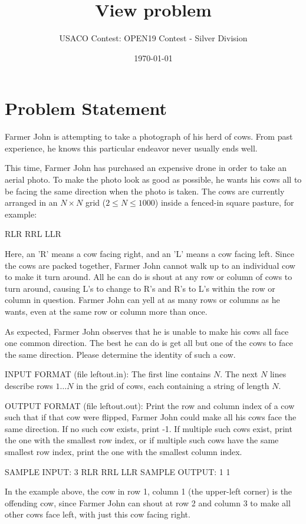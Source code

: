 \documentclass[12pt]{article}
\title{View problem}
\author{USACO Contest: OPEN19 Contest - Silver Division}
\date{\today}
\begin{document}
\maketitle

\section*{Problem Statement}

Farmer John is attempting to take a photograph of his herd of cows.  From past
experience, he knows this particular endeavor never usually ends well.  

This time, Farmer John has purchased an expensive drone in order to take an
aerial photo. To make the photo look as good as possible, he wants his cows all
to be facing the same direction when the photo is taken.  The cows are currently arranged
in an  $N \times N$ grid ($2 \leq N \leq 1000$) inside a fenced-in square
pasture,  for example:


RLR
RRL
LLR

Here, an 'R' means a cow facing right, and an 'L' means a cow facing left. Since
the cows are packed together, Farmer John cannot walk up to an individual cow to
make it turn around.  All he can do is shout at any row or column of cows to
turn around, causing L's to change to R's and R's to L's within the row or
column in question.  Farmer John can yell at as many rows or columns as he
wants, even at the same row or column more than once.

As expected, Farmer John observes that he is unable to make his cows all face
one common direction.  The best he can do is get all but one of the cows to face
the same direction.  Please determine the identity of such a cow.

INPUT FORMAT (file leftout.in):
The first line contains $N$.  The next $N$ lines describe rows $1 \ldots N$ in 
the grid of cows, each containing a string of length $N$.

OUTPUT FORMAT (file leftout.out):
Print the row and column index of a cow such that if that cow were flipped,
Farmer John could make all his cows face the same direction.  If no such cow
exists, print -1.  If multiple such cows exist, print the one with the  smallest
row index, or if multiple such cows have the same smallest row index, print the
one with the smallest column index.

SAMPLE INPUT:
3
RLR
RRL
LLR
SAMPLE OUTPUT: 
1 1

In the example above, the cow in row 1, column 1 (the upper-left corner) is the
offending cow, since Farmer John can shout at row 2 and column 3 to make all
other cows face left, with just this cow facing right.
\end{document}
